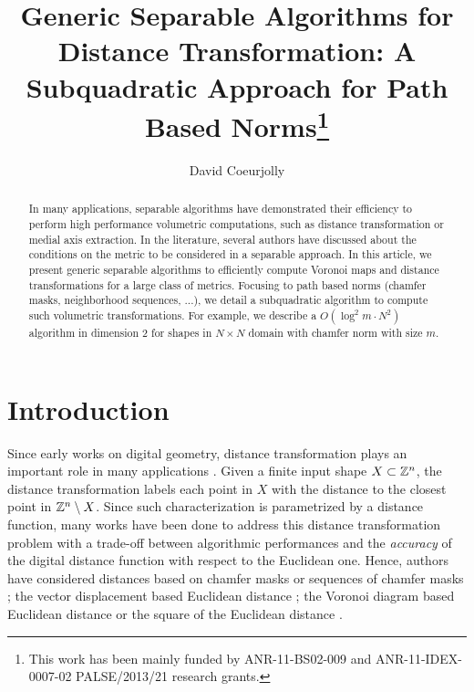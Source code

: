 \documentclass{llncs}
\title{Generic Separable Algorithms for Distance Transformation: A
  Subquadratic Approach for Path Based Norms\thanks{This work has been
    mainly funded by ANR-11-BS02-009 and ANR-11-IDEX-0007-02
    PALSE/2013/21 research grants.}}
\author{David Coeurjolly}
\institute{ CNRS,  LIRIS, UMR5205, F-69621, France\\
}
\begin{document}
\maketitle


\begin{abstract}\sloppy
In many applications, separable algorithms have demonstrated their
efficiency to perform high performance volumetric computations, such
as distance transformation or medial axis extraction. In the
literature, several authors have discussed about the conditions on the
metric to be considered in a separable approach.  In this article, we
present generic separable algorithms to efficiently compute Voronoi
maps and distance transformations for a large class of
metrics. Focusing to path based norms (chamfer masks, neighborhood
sequences, ...), we detail a subquadratic algorithm to compute such
volumetric transformations. For example, we describe a
$O(\log^2{m}\cdot N^2)$ algorithm in dimension 2 for shapes in
$N\times N$ domain with chamfer norm with size $m$.

\end{abstract}

\section{Introduction}
\label{sec:introduction}

Since early works on digital geometry, distance transformation plays
an important role in many applications
\cite{Rosenfeld1966,Rosenfeld1968}. Given a finite input shape
$X\subset {\mathbb{Z}}^n$, the distance transformation labels each point in $X$
with the distance to the closest point in ${\mathbb{Z}}^n \setminus X$. Since
such characterization is parametrized by a distance function, many
works have been done to address this distance transformation problem
with a trade-off between algorithmic performances and the
\emph{accuracy} of the digital distance function with respect to the
Euclidean one.  Hence, authors have considered distances based on
chamfer masks
\cite{Rosenfeld1968,borgefors,Thiel_IWCIA7,fouard:ivc:2005} or
sequences of chamfer masks
\cite{ROSEN_66,mukherjee,Nagy05,Strand2008,DBLP:conf/dgci/NormandSE13};
the vector displacement based Euclidean distance
\cite{danielson,ragnemalm,MULL_92,Cuisenaire1999_268}; the Voronoi
diagram based Euclidean distance
\cite{BreuEtAl95,maurer_pami} or the square of the
Euclidean distance \cite{SaitTori:94,Hirata,roerdnik}.
\end{document}
